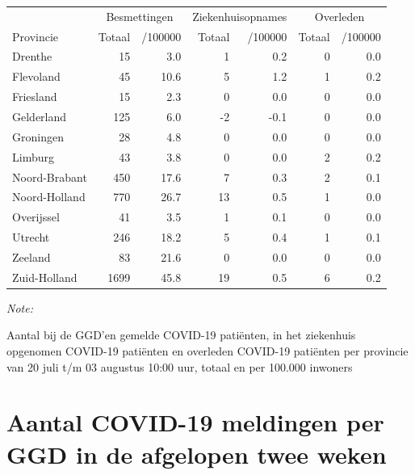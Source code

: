 \documentclass[
  english,
  man,floatsintext]{apa6}
\begin{document}
\begin{table}[H]
\centering
\begin{threeparttable}
\begin{tabular}{lrrrrrr}
\toprule
\multicolumn{1}{c}{ } & \multicolumn{2}{c}{Besmettingen} & \multicolumn{2}{c}{Ziekenhuisopnames} & \multicolumn{2}{c}{Overleden} \\
\cmidrule(l{3pt}r{3pt}){2-3} \cmidrule(l{3pt}r{3pt}){4-5} \cmidrule(l{3pt}r{3pt}){6-7}
Provincie & Totaal & /100000 & Totaal & /100000 & Totaal & /100000\\
\midrule
Drenthe & 15 & 3.0 & 1 & 0.2 & 0 & 0.0\\
Flevoland & 45 & 10.6 & 5 & 1.2 & 1 & 0.2\\
Friesland & 15 & 2.3 & 0 & 0.0 & 0 & 0.0\\
Gelderland & 125 & 6.0 & -2 & -0.1 & 0 & 0.0\\
Groningen & 28 & 4.8 & 0 & 0.0 & 0 & 0.0\\
Limburg & 43 & 3.8 & 0 & 0.0 & 2 & 0.2\\
Noord-Brabant & 450 & 17.6 & 7 & 0.3 & 2 & 0.1\\
Noord-Holland & 770 & 26.7 & 13 & 0.5 & 1 & 0.0\\
Overijssel & 41 & 3.5 & 1 & 0.1 & 0 & 0.0\\
Utrecht & 246 & 18.2 & 5 & 0.4 & 1 & 0.1\\
Zeeland & 83 & 21.6 & 0 & 0.0 & 0 & 0.0\\
Zuid-Holland & 1699 & 45.8 & 19 & 0.5 & 6 & 0.2\\
\bottomrule
\end{tabular}
\begin{tablenotes}
\item \textit{Note: } 
\item Aantal bij de GGD’en gemelde COVID-19 patiënten, in het ziekenhuis opgenomen COVID-19 patiënten en overleden COVID-19 patiënten per provincie van 20 juli t/m 03 augustus 10:00 uur, totaal en per 100.000 inwoners
\end{tablenotes}
\end{threeparttable}
\end{table}

\newpage

\hypertarget{aantal-covid-19-meldingen-per-ggd-in-de-afgelopen-twee-weken}{%
\section{Aantal COVID-19 meldingen per GGD in de afgelopen twee weken}\label{aantal-covid-19-meldingen-per-ggd-in-de-afgelopen-twee-weken}}
\end{document}

